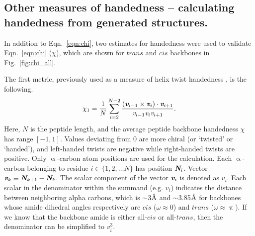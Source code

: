 \documentclass[fleqn,10pt]{wlpeerj} %
\newcommand{\Fig}[1]{Fig.~\ref{#1}}
\newcommand{\Eqn}[1]{Eqn.~\ref{#1}}
\newcommand{\ang}{$\textrm\AA$\xspace}
\begin{document}
\subsection*{Other measures of handedness -- calculating handedness from generated structures.} 

In addition to \Eqn{eqn:chi}, two estimates for handedness were used to validate \Eqn{eqn:chi} ($\chi$), which are shown for $trans$ and $cis$ backbones in \Fig{fig:chi_all}. 

The first metric, previously used as a measure of helix twist handedness \citep{Kwiecinska2005}, is the following.
\begin{equation} \label{eqn:chi1}
\chi_1 = \frac{1}{N}\sum_{i = 2}^{N-2} \frac{(\textit{\textbf{v}}_{i-1} \times \textit{\textbf{v}}_{i})\cdot \textit{\textbf{v}}_{i+1}}{\textit{v}_{i-1} \textit{v}_{i} \textit{v}_{i+1}}.
\end{equation}
Here, $N$ is the peptide length, and the average peptide backbone handedness $\chi$ has range $[-1,1]$. Values deviating from 0 are more chiral (or `twisted' or `handed'), and left-handed twists are negative while right-handed twists are positive. Only $\upalpha$-carbon atom positions are used for the calculation. Each $\upalpha$-carbon belonging to residue $i \in \{ 1,2,\ldots N \}$ has position $\textit{\textbf{N}}_i$. %
Vector $\textit{\textbf{v}}_{k} \equiv \textit{\textbf{N}}_{k+1} - \textit{\textbf{N}}_{k}$. 
The scalar component of the vector $\textit{\textbf{v}}_i$ is denoted as $\textit{v}_i$. Each scalar in the denominator within the summand (e.g. $\textit{v}_i$) indicates the distance between neighboring alpha carbons, which is $\sim$3\ang and $\sim$3.85\ang for backbones whose amide dihedral angles respectively are $cis$ ($\omega\approx0$) and $trans$ ($\omega\approx\uppi$). If we know that the backbone amide is either all-$cis$ or all-$trans$, then the denominator can be simplified to $\textit{v}_i^3$.
\end{document}
